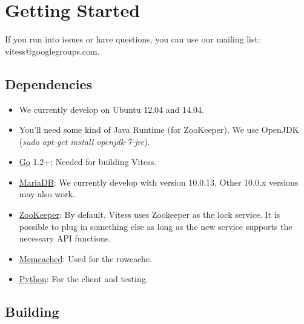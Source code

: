 \section{Getting Started}\label{Getting-Started}

If you run into issues or have questions, you can use our mailing list: vitess@googlegroups.com.

\subsection{Dependencies}\label{dependencies}

\begin{itemize}
\item We currently develop on Ubuntu 12.04 and 14.04.
\item You'll need some kind of Java Runtime (for ZooKeeper).
We use OpenJDK (\emph{sudo apt-get install openjdk-7-jre}).
\item \href{http://golang.org}{Go} 1.2+: Needed for building Vitess.
\item \href{https://mariadb.org/}{MariaDB}: We currently develop with version 10.0.13.
Other 10.0.x versions may also work.
\item \href{http://zookeeper.apache.org/}{ZooKeeper}: By default, Vitess
uses Zookeeper as the lock service. It is possible to plug in
something else as long as the new service supports the
necessary API functions.
\item \href{http://memcached.org}{Memcached}: Used for the rowcache.
\item \href{http://python.org}{Python}: For the client and testing.
\end{itemize}

\subsection{Building}\hypertarget{building}{}\label{building}

